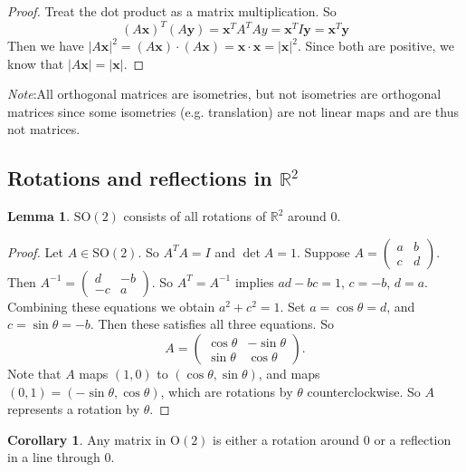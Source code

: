 \documentclass[a4paper]{article}
\theoremstyle{definition}
\newtheorem*{lemma}{Lemma}
\newtheorem*{cor}{Corollary}
\newcommand{\mb}[1]{\mathbf{#1}}
\newcommand{\note}{\noindent \emph{Note}:\;}
\newcommand{\R}{\mathbb{R}}
\newcommand{\Or}{\mathrm{O}}
\newcommand{\SO}{\mathrm{SO}}
\begin{document}
\begin{proof}
  Treat the dot product as a matrix multiplication. So
  \[
  (A\mb{x})^T(A\mb{y}) = \mb{x}^{T}A^TAy = \mb{x}^TI\mb{y} = \mb{x}^T\mb{y}
  \]
  Then we have $|A\mb{x}|^2 = (A\mb{x})\cdot (A\mb{x}) = \mb{x}\cdot \mb{x} = |\mb{x}|^2$. Since both are positive, we know that $|A\mb{x}| = |\mb{x}|$.
\end{proof}
\note All orthogonal matrices are isometries, but not isometries are orthogonal matrices since some isometries (e.g. translation) are not linear maps and are thus not matrices.
\subsection{Rotations and reflections in \texorpdfstring{$\R^2$}{R2}}
\begin{lemma}
  $\SO(2)$ consists of all rotations of $\R^2$ around 0.
\end{lemma}

\begin{proof}
  Let $A\in \SO(2)$. So $A^TA = I$ and $\det A = 1$. Suppose $A = 
  \begin{pmatrix}
    a & b\\c & d
  \end{pmatrix}$. Then $A^{-1} = 
  \begin{pmatrix}
    d & -b\\-c & a
  \end{pmatrix}.$ So $A^T = A^{-1}$ implies $ad - bc = 1$, $c = -b$, $d = a$. Combining these equations we obtain $a^2 + c^2 = 1$. Set $a = \cos\theta = d$, and $c = \sin\theta = -b$. Then these satisfies all three equations. So
  \[
  A = 
  \begin{pmatrix}
    \cos\theta & -\sin\theta\\
    \sin\theta & \cos\theta
  \end{pmatrix}.
  \]
  Note that $A$ maps $(1, 0)$ to $(\cos\theta, \sin \theta)$, and maps $(0, 1)= (-\sin\theta, \cos\theta)$, which are rotations by $\theta$ counterclockwise. So $A$ represents a rotation by $\theta$.
\end{proof}

\begin{cor}
  Any matrix in $\Or(2)$ is either a rotation around $0$ or a reflection in a line through $0$.
\end{cor}
\end{document}
